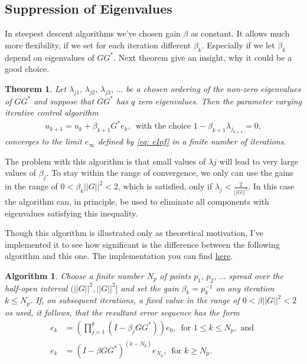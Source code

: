 \documentclass[12pt,ngerman]{article}
\def\l{\left(}
\def\r{\right)}
\newtheorem{theorem}{Theorem}
\newtheorem{alg}{Algorithm}
\begin{document}
\subsection{Suppression of Eigenvalues}
In steepest descent algorithms we've chosen gain $\beta$ as constant. It allows much more flexibility, if we set for each iteration different $\beta_k$. Especially if we let $\beta_k$ depend on eigenvalues of $GG^*$. Next theorem give an insight, why it could be a good choice. 
\begin{theorem}
	Let $\lambda_{j1}, \, \lambda_{j2}, \, \lambda_{j3}, \, \dots$ be a chosen ordering of the non-zero eigenvalues of $GG^*$ and suppose that $GG^*$ has $q$ zero eigenvalues. Then the parameter varying iterative control algorithm 
	\begin{align*}
	u_{k+1} = u_k + \beta_{k+1} G^*e_k,  \, \text{ with the choice } 1 - \beta_{k+1}\lambda_{j_{k+1}} = 0,
	\end{align*}
	converges to the limit $e_\infty$ defined by \eqref{eq: eInf} in a finite number of iterations. 
\end{theorem}

The problem with this algorithm is that small values of $\lambda{j}$ will lead to very large values of $\beta_j$. To stay within the range of convergence, we only can use the gains in the range of $0<\beta_k ||G||^2 <2$, which is satisfied, only if $\lambda_{j} < \frac{2}{||G||^2}$. In this case the algorithm can, in principle, be used to eliminate all components with eigenvalues satisfying this inequality. 

{\color{pink} Though this algorithm is illustrated only as theoretical motivation, I've implemented it to see how significant is the difference between the following algorithm and this one. The implementation you can find  \href{run ./MATLAB/SDA_beta_as_evs.m}{here}}.

\begin{alg}
	Choose a finite number $N_p$ of points $p_1, \, p_2, \, \dots$ spread over the half-open interval $(||G||^2, ||G||^2]$ and set the gain $\beta_k = p_k^{-1}$ on any iteration $k\leq N_p$. If, on subsequent iterations, a fixed value in the range of $0<\beta ||G||^2 < 2$ os used, it follows, that the resultant error sequence has the form 
	\begin{align}
	    e_k &= \l \prod_{j=1}^k (I - \beta_j G G^*)\r e_0, \, \text{ for } 1\leq k \leq N_p, \text{ and } \\
	    e_k &= (I - \beta GG^*)^{(k-N_p)}e_{N_p}, \, \text{ for } k \geq N_p.
    \end{align}
\end{alg}
\end{document}

